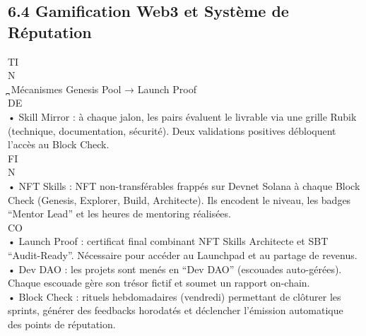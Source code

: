 \documentclass[12pt,landscape,a4paper]{article}
\begin{document}
\subsection{6.4 Gamification Web3 et Système de Réputation}
\vspace{0.5em}
\vspace{0.5em}
\vspace{0.5em}
\vspace{0.5em}
TI\\
N\\
̪ Mécanismes Genesis Pool → Launch Proof\\
\vspace{0.5em}
\vspace{0.5em}
\vspace{0.5em}
\vspace{0.5em}
DE\\
• Skill Mirror : à chaque jalon, les pairs évaluent le livrable via une grille Rubik (technique, documentation, sécurité). Deux validations positives débloquent\\
l’accès au Block Check.\\
\vspace{0.5em}
\vspace{0.5em}
\vspace{0.5em}
\vspace{0.5em}
FI\\
N\\
• NFT Skills : NFT non-transférables frappés sur Devnet Solana à chaque Block Check (Genesis, Explorer, Build, Architecte). Ils encodent le niveau, les badges\\
“Mentor Lead” et les heures de mentoring réalisées.\\
CO\\
• Launch Proof : certificat final combinant NFT Skills Architecte et SBT “Audit-Ready”. Nécessaire pour accéder au Launchpad et au partage de revenus.\\
• Dev DAO : les projets sont menés en “Dev DAO” (escouades auto-gérées). Chaque escouade gère son trésor fictif et soumet un rapport on-chain.\\
• Block Check : rituels hebdomadaires (vendredi) permettant de clôturer les sprints, générer des feedbacks horodatés et déclencher l’émission automatique\\
des points de réputation.\\
\vspace{0.5em}
\vspace{0.5em}
\vspace{0.5em}
\end{document}
